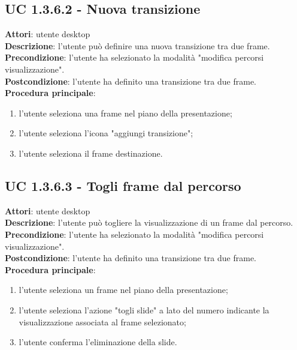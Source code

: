 \subsection{UC 1.3.6.2 - Nuova transizione}{
	\label{uc1.3.6.2}
	\textbf{Attori}: utente desktop \\
	\textbf{Descrizione}: l'utente può definire una nuova transizione tra due frame. \\
	\textbf{Precondizione}: l'utente ha selezionato la modalità "modifica percorsi visualizzazione".	\\
	\textbf{Postcondizione}: l'utente ha definito una transizione tra due frame.	\\
	\textbf{Procedura principale}:
	\begin{enumerate}
		\item l'utente seleziona una frame nel piano della presentazione;
		\item l'utente seleziona l'icona "aggiungi transizione";
		\item l'utente seleziona il frame destinazione.
	\end{enumerate}
}
\subsection{UC 1.3.6.3 - Togli frame dal percorso}{
	\label{uc1.3.6.3}
	\textbf{Attori}: utente desktop \\
	\textbf{Descrizione}: l'utente può togliere la visualizzazione di un frame dal percorso. \\
	\textbf{Precondizione}: l'utente ha selezionato la modalità "modifica percorsi visualizzazione".	\\
	\textbf{Postcondizione}: l'utente ha definito una transizione tra due frame.	\\
	\textbf{Procedura principale}:
	\begin{enumerate}
		\item l'utente seleziona un frame nel piano della presentazione;
		\item l'utente seleziona l'azione "togli slide" a lato del numero indicante la visualizzazione associata al frame selezionato;
		\item l'utente conferma l'eliminazione della slide.
	\end{enumerate}
}
